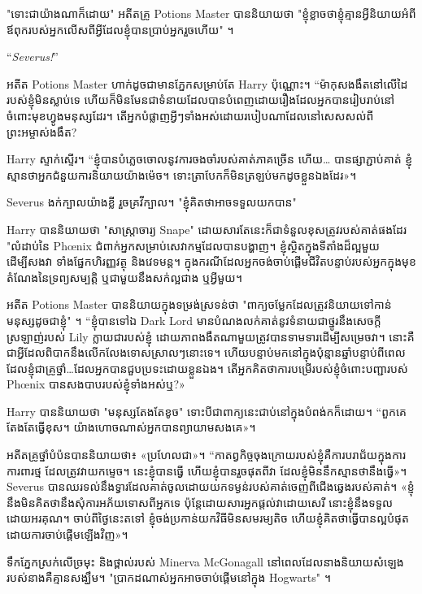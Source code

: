 "ទោះជាយ៉ាងណាក៏ដោយ" អតីតគ្រូ Potions Master បាននិយាយថា "ខ្ញុំខ្លាចថាខ្ញុំគ្មានអ្វីនិយាយអំពីឪពុករបស់អ្នកលើសពីអ្វីដែលខ្ញុំបានប្រាប់អ្នករួចហើយ" ។

“\emph{Severus!}”

អតីត Potions Master ហាក់ដូចជាមានភ្នែកសម្រាប់តែ Harry ប៉ុណ្ណោះ។ “ម៉ាកុសងងឹតនៅលើដៃរបស់ខ្ញុំមិនស្លាប់ទេ ហើយក៏មិនមែនជាទំនាយដែលបានបំពេញដោយរឿងដែលអ្នកបានរៀបរាប់នៅចំពោះមុខហ្វូងមនុស្សដែរ។ តើ​អ្នក​បំផ្លាញ​អ្វីៗ​ទាំង​អស់​ដោយ​របៀប​ណា​ដែល​នៅ​សេសសល់​ពី​ព្រះអម្ចាស់​ងងឹត?

Harry ស្ទាក់ស្ទើរ។ “ខ្ញុំបានបំភ្លេចចោលនូវការចងចាំរបស់គាត់ភាគច្រើន ហើយ… បានផ្សាភ្ជាប់គាត់ ខ្ញុំស្មានថាអ្នកជំនួយការនិយាយយ៉ាងម៉េច។ ទោះ​ត្រា​បែក​ក៏​មិន​ត្រឡប់​មក​ដូច​ខ្លួន​ឯង​ដែរ»។

Severus ងក់ក្បាលយ៉ាងខ្លី រួចគ្រវីក្បាល។ "ខ្ញុំគិតថាអាចទទួលយកបាន"

Harry បាននិយាយថា "សាស្រ្តាចារ្យ Snape" ដោយសារតែនេះក៏ជាទំនួលខុសត្រូវរបស់គាត់ផងដែរ "លំដាប់នៃ Phœnix ជំពាក់អ្នកសម្រាប់សេវាកម្មដែលបានបង្ហាញ។ ខ្ញុំស្ថិតក្នុងទីតាំងដ៏ល្អមួយដើម្បីសងវា ទាំងផ្នែកហិរញ្ញវត្ថុ និងវេទមន្ត។ ក្នុងករណីដែលអ្នកចង់ចាប់ផ្តើមជីវិតបន្ទាប់របស់អ្នកក្នុងមុខតំណែងនៃទ្រព្យសម្បត្តិ ឬជាមួយនឹងសក់ល្អជាង ឬអ្វីមួយ។

អតីត Potions Master បាននិយាយក្នុងទម្រង់ស្រទន់ថា "ពាក្យចម្លែកដែលត្រូវនិយាយទៅកាន់មនុស្សដូចជាខ្ញុំ" ។ “ខ្ញុំបានទៅឯ Dark Lord មានបំណងលក់គាត់នូវទំនាយជាថ្នូរនឹងសេចក្តីស្រឡាញ់របស់ Lily ក្លាយជារបស់ខ្ញុំ ដោយភាពងងឹតណាមួយត្រូវបានទាមទារដើម្បីសម្រេចវា។ នោះ​គឺ​ជា​អ្វី​ដែល​ពិបាក​នឹង​លើក​លែង​ទោស​ស្រាលៗ​នោះ​ទេ។ ហើយបន្ទាប់មកនៅក្នុងប៉ុន្មានឆ្នាំបន្ទាប់ពីពេលដែលខ្ញុំជាគ្រូថ្នាំ…ដែលអ្នកបានជួបប្រទះដោយខ្លួនឯង។ តើ​អ្នក​គិត​ថា​ការ​បម្រើ​របស់​ខ្ញុំ​ចំពោះ​បញ្ជា​របស់ Phœnix បាន​សង​បាប​របស់​ខ្ញុំ​ទាំង​អស់​ឬ?»

Harry បាននិយាយថា "មនុស្សតែងតែខូច" ទោះបីជាពាក្យនេះជាប់នៅក្នុងបំពង់កក៏ដោយ។ “ពួកគេតែងតែធ្វើខុស។ យ៉ាង​ហោច​ណាស់​អ្នក​បាន​ព្យាយាម​សង​គេ»។

អតីត​គ្រូ​ថ្នាំ​បំប៉ន​បាន​និយាយ​ថា៖ «ប្រហែល​ជា»។ “កាតព្វកិច្ចចុងក្រោយរបស់ខ្ញុំគឺការបរាជ័យក្នុងការការពារថ្ម ដែលត្រូវវាយកម្ទេច។ នេះ​ខ្ញុំ​បាន​ធ្វើ ហើយ​ខ្ញុំ​បាន​រួច​ផុត​ពី​វា ដែល​ខ្ញុំ​មិន​នឹក​ស្មាន​ថា​នឹង​ធ្វើ»។ Severus បាន​ឈរ​ទល់​នឹង​ទ្វារ​ដែល​គាត់​ចូល​ដោយ​យក​ទម្ងន់​របស់​គាត់​ចេញ​ពី​ជើង​ឆ្វេង​របស់​គាត់។ «ខ្ញុំ​នឹង​មិន​គិត​ថា​នឹង​សុំ​ការ​អភ័យទោស​ពី​អ្នក​ទេ ប៉ុន្តែ​ដោយសារ​អ្នក​ផ្តល់​វា​ដោយ​សេរី នោះ​ខ្ញុំ​នឹង​ទទួល​ដោយ​អរគុណ។ ចាប់ពីថ្ងៃនេះតទៅ ខ្ញុំចង់ប្រកាន់យកវិធីមិនសមរម្យតិច ហើយខ្ញុំគិតថាធ្វើបានល្អបំផុតដោយការចាប់ផ្ដើមឡើងវិញ»។

ទឹកភ្នែកស្រក់លើច្រមុះ និងថ្ពាល់របស់ Minerva McGonagall នៅពេលដែលនាងនិយាយសំឡេងរបស់នាងគឺគ្មានសង្ឃឹម។ "ប្រាកដណាស់អ្នកអាចចាប់ផ្តើមនៅក្នុង Hogwarts" ។

